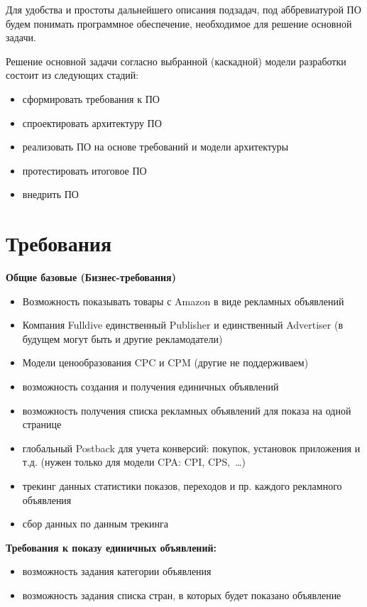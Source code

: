 \documentclass[times]{itmo-student-thesis}
\begin{document}
Для удобства и простоты дальнейшего описания подзадач, под аббревиатурой ПО будем понимать программное обеспечение, необходимое для решение основной задачи.

Решение основной задачи согласно выбранной (каскадной) модели разработки состоит из следующих стадий:
\begin{itemize}
	\item сформировать требования к ПО
	\item спроектировать архитектуру ПО
	\item реализовать ПО на основе требований и модели архитектуры
	\item протестировать итоговое ПО
	\item внедрить ПО
\end{itemize}
\bigbreak


\section{Требования}\label{sec:requirements}


\textbf{Общие базовые (Бизнес-требования)}
\begin{itemize}
	\item Возможность показывать товары с Amazon в виде рекламных объявлений
	\item Компания Fulldive единственный Publisher и единственный Advertiser (в будущем могут быть и другие рекламодатели)
	\item Модели ценообразования CPC и CPM (другие не поддерживаем)
	\item возможность создания и получения единичных объявлений
	\item возможность получения списка рекламных объявлений для показа на одной странице
	\item глобальный Postback для учета конверсий: покупок, установок приложения и т.д. (нужен только для модели CPA: CPI, CPS, …)
	\item трекинг данных статистики показов, переходов и пр. каждого рекламного объявления
	\item сбор данных по данным трекинга
\end{itemize}

\textbf{Требования к показу единичных объявлений:}
\begin{itemize}
	\item возможность задания категории объявления
	\item возможность задания списка стран, в которых будет показано объявление
\end{itemize}
\end{document}
